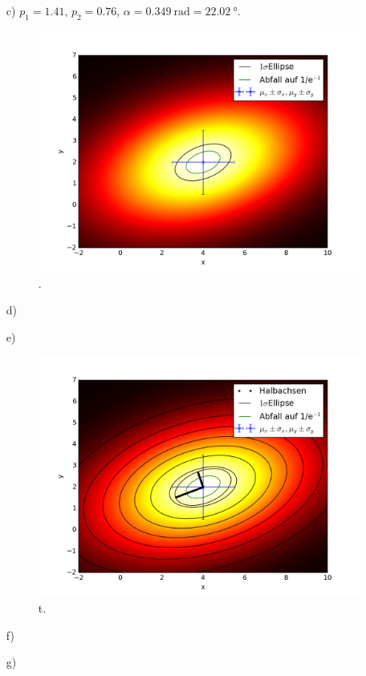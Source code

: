 \begin{itemize}
\item[c)]
$p_1=1.41$, $p_2=0.76$, $\alpha=\SI{0.349}{\radian}=\SI{22.02}{\degree}$.
\begin{figure}
\centering
\includegraphics[width=\textwidth]{plot_4c.png}
\caption{.}
\end{figure}
\item[d)]
\item[e)]
\begin{figure}
\centering
\includegraphics[width=\textwidth]{plot_4e.png}
\caption{t.}
\end{figure}
\item[f)]
\item[g)]
\end{itemize}
